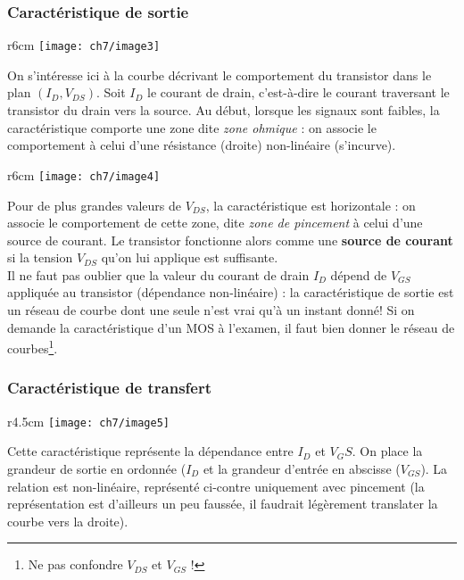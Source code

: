 	
	\subsubsection{Caractéristique de sortie}
			\begin{wrapfigure}[7]{r}{6cm}
	\vspace{-0.8cm}
	\texttt{[image: ch7/image3]}
		\end{wrapfigure}	
	On s'intéresse ici à la courbe décrivant le comportement du transistor dans le plan 
	$(I_D,V_{DS})$. Soit $I_D$ le courant de drain, c'est-à-dire le courant traversant 
	le transistor du drain vers la source. Au début, lorsque les signaux sont faibles, 
	la caractéristique comporte une zone dite \textit{zone ohmique} : on associe le 
	comportement à celui d'une résistance (droite) non-linéaire (s'incurve).
	
\newpage	
			\begin{wrapfigure}[8]{r}{6cm}
	\vspace{-0.5cm}
	\texttt{[image: ch7/image4]}
		\end{wrapfigure}	
	 Pour de 
	plus grandes valeurs de $V_{DS}$, la caractéristique est horizontale : on associe 
	le comportement de cette zone, dite \textit{zone de pincement} à celui d'une 
	source de courant. Le transistor fonctionne alors comme une \textbf{source de courant} 
	si la tension $V_{DS}$ qu'on lui applique est suffisante.\\
	
	Il ne faut pas oublier que la valeur du courant de drain $I_D$ dépend de $V_{GS}$ appliquée 
	au transistor (dépendance non-linéaire) : 
	la caractéristique de 
	sortie est un réseau de courbe dont une seule n'est vrai qu'à un instant donné! Si 
	on demande la caractéristique d'un MOS à l'examen, il faut bien donner le réseau de 
	courbes\footnote{\danger Ne pas confondre $V_{DS}$ et $V_{GS}$ !}.
	
	\subsubsection{Caractéristique de transfert}
	\begin{wrapfigure}[8]{r}{4.5cm}
	\vspace{-0.8cm}
	\texttt{[image: ch7/image5]}
	\end{wrapfigure}	
	Cette caractéristique représente la dépendance entre $I_D$ et $V_GS$. On place 
	la grandeur de sortie en ordonnée ($I_D$ et la grandeur d'entrée en abscisse 
	($V_{GS}$). La relation est non-linéaire, représenté ci-contre uniquement avec 
	pincement (la représentation est d'ailleurs un peu faussée, il faudrait légèrement 
	translater la courbe vers la droite).
	
